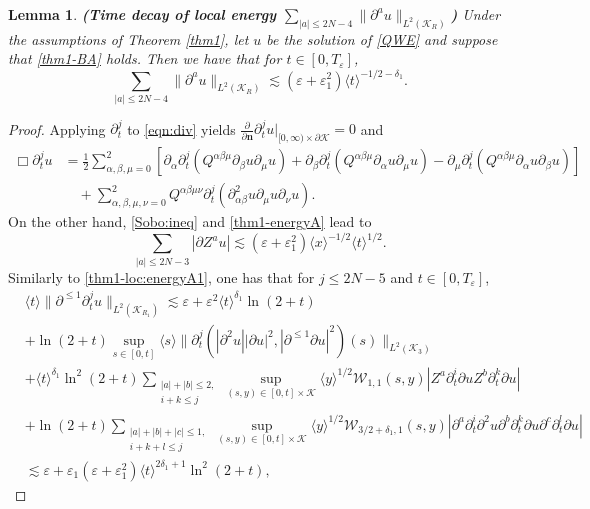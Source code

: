 \documentclass[11pt,twoside]{article}
\def\cK{\mathcal K}
\def\cW{\mathcal W}
\def\ds{\displaystyle}
\def\p{\partial}
\def\ve{\varepsilon}
\def\ls{\lesssim}
\def\bn{\mathbf{n}}
\newcommand{\w}[1]{\langle {#1} \rangle}
\theoremstyle{plain}
\newtheorem{lemma}[theorem]{Lemma}
\theoremstyle{definition}
\numberwithin{equation}{section}
\begin{document}
\begin{lemma}
{\bf (Time decay of local energy $\ds\sum_{|a|\le2N-4}\|\p^au\|_{L^2(\cK_R)}$)}
Under the assumptions of Theorem \ref{thm1}, let $u$ be the solution of \eqref{QWE} and suppose that \eqref{thm1-BA} holds.
Then we have that for $t\in[0,T_\ve]$,
\begin{equation}\label{thm1-loc:energyB}
\sum_{|a|\le2N-4}\|\p^au\|_{L^2(\cK_R)}\ls(\ve+\ve_1^2)\w{t}^{-1/2-\delta_1}.
\end{equation}
\end{lemma}
\begin{proof}
Applying $\p_t^j$ to \eqref{eqn:div} yields $\ds\frac{\p}{\p\bn}\p_t^ju|_{[0,\infty)\times\p\cK}=0$ and
\begin{equation*}
\begin{split}
\Box\p_t^ju&=\frac12\sum_{\alpha,\beta,\mu=0}^2[\p_{\alpha}\p_t^j(Q^{\alpha\beta\mu}\p_{\beta}u\p_{\mu}u)
+\p_{\beta}\p_t^j(Q^{\alpha\beta\mu}\p_{\alpha}u\p_{\mu}u)
-\p_{\mu}\p_t^j(Q^{\alpha\beta\mu}\p_{\alpha}u\p_{\beta}u)]\\
&\quad+\sum_{\alpha,\beta,\mu,\nu=0}^2Q^{\alpha\beta\mu\nu}\p_t^j(\p^2_{\alpha\beta}u\p_{\mu}u\p_{\nu}u).
\end{split}
\end{equation*}
On the other hand, \eqref{Sobo:ineq} and \eqref{thm1-energyA} lead to
\begin{equation}\label{thm1-loc:energyB1}
\sum_{|a|\le2N-3}|\p Z^au|\ls(\ve+\ve_1^2)\w{x}^{-1/2}\w{t}^{1/2}.
\end{equation}
Similarly to \eqref{thm1-loc:energyA1}, one has that for $j\le2N-5$ and $t\in[0,T_\ve]$,
\begin{equation*}
\begin{split}
&\w{t}\|\p^{\le1}\p_t^ju\|_{L^2(\cK_{R_1})}\ls\ve+\ve^2\w{t}^{\delta_1}\ln(2+t)\\
&+\ln(2+t)\sup_{s\in[0,t]}\w{s}\|\p_t^j(|\p^2u||\p u|^2,|\p^{\le1}\p u|^2)(s)\|_{L^2(\cK_3)}\\
&+\w{t}^{\delta_1}\ln^2(2+t)\sum_{\substack{|a|+|b|\le2,\\ i+k\le j}}
\sup_{(s,y)\in[0,t]\times\cK}\w{y}^{1/2}\cW_{1,1}(s,y)|Z^a\p_t^i\p uZ^b\p_t^k\p u|\\
&+\ln(2+t)\sum_{\substack{|a|+|b|+|c|\le1,\\ i+k+l\le j}}\sup_{(s,y)\in[0,t]\times\cK}\w{y}^{1/2}\cW_{3/2+\delta_1,1}(s,y)
|\p^a\p_t^i\p^2u\p^b\p_t^k\p u\p^c\p_t^l\p u|\\
&\ls\ve+\ve_1(\ve+\ve_1^2)\w{t}^{2\delta_1+1}\ln^2(2+t),
\end{split}

\end{equation*}
\end{proof}
\end{document}

